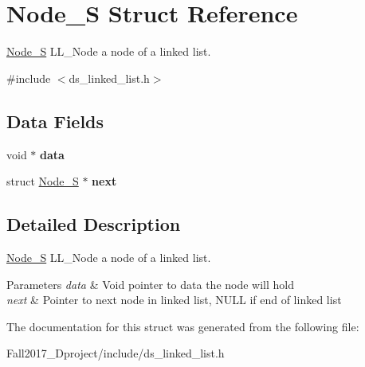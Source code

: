 \hypertarget{struct_node___s}{}\section{Node\+\_\+S Struct Reference}
\label{struct_node___s}


\hyperlink{struct_node___s}{Node\+\_\+S} L\+L\+\_\+\+Node a node of a linked list.  




{\ttfamily \#include $<$ds\+\_\+linked\+\_\+list.\+h$>$}

\subsection*{Data Fields}
\begin{DoxyCompactItemize}
\item 
\mbox{\label{struct_node___s_a735984d41155bc1032e09bece8f8d66d}} 
void $\ast$ {\bfseries data}
\item 
\mbox{\label{struct_node___s_aa06ac35a70bd6374c9178f1bce8d5368}} 
struct \hyperlink{struct_node___s}{Node\+\_\+S} $\ast$ {\bfseries next}
\end{DoxyCompactItemize}


\subsection{Detailed Description}
\hyperlink{struct_node___s}{Node\+\_\+S} L\+L\+\_\+\+Node a node of a linked list. 


\begin{DoxyParams}{Parameters}
{\em data} & Void pointer to data the node will hold \\
\hline
{\em next} & Pointer to next node in linked list, N\+U\+LL if end of linked list \\
\hline
\end{DoxyParams}


The documentation for this struct was generated from the following file\+:\begin{DoxyCompactItemize}
\item 
Fall2017\+\_\+Dproject/include/ds\+\_\+linked\+\_\+list.\+h\end{DoxyCompactItemize}
